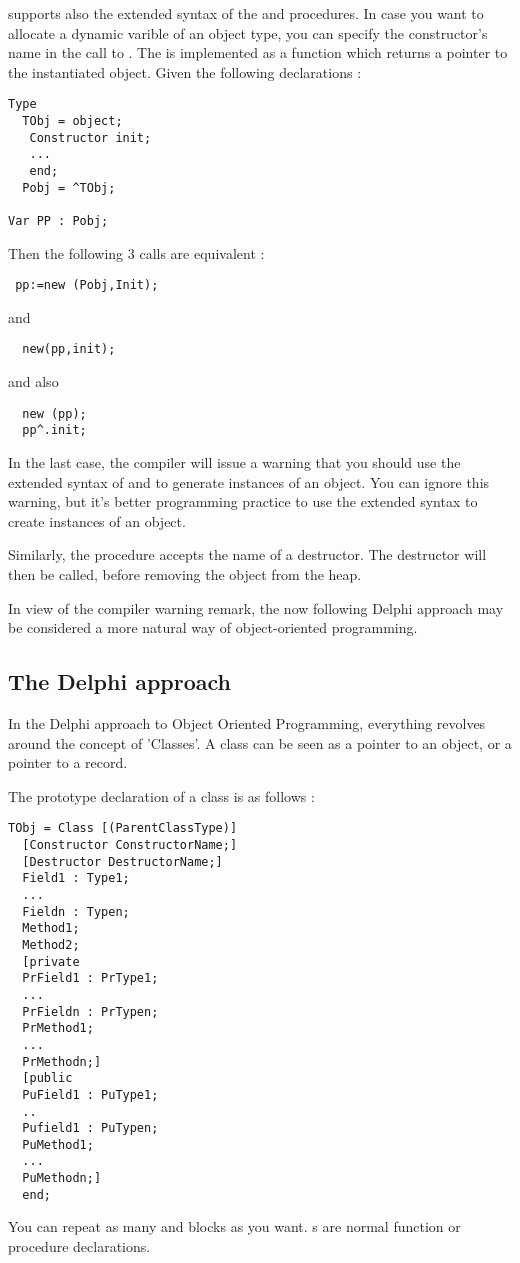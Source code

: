 \documentclass{report}
\begin{document}
\fpk supports also the extended syntax of the  and 
procedures. In case you want to allocate a dynamic varible of an object
type, you can specify the constructor's name in the call to .
The  is implemented as a function which returns a pointer to the
instantiated object. Given the following declarations :
\begin{verbatim}
Type
  TObj = object;
   Constructor init;
   ...
   end;
  Pobj = ^TObj;

Var PP : Pobj;
\end{verbatim}  
Then the following 3 calls are equivalent :
\begin{verbatim}
 pp:=new (Pobj,Init);
\end{verbatim}
and
\begin{verbatim}
  new(pp,init);
\end{verbatim}
and also
\begin{verbatim}
  new (pp);
  pp^.init;
\end{verbatim}
In the last case, the compiler will issue a warning that you should use the
extended syntax of  and  to generate instances of an
object. You can ignore this warning, but it's better programming practice to
use the extended syntax to create instances of an object.

Similarly, the  procedure accepts the name of a destructor. The
destructor will then be called, before removing the object from the heap.

In view of the compiler warning remark, the now following Delphi approach may 
be considered a more natural way of object-oriented programming.

\subsection{The Delphi approach}
In the Delphi approach to Object Oriented Programming, everything revolves
around  the concept of 'Classes'. 
A class can be seen as a pointer to an object, or a pointer to a record. 

The prototype declaration of a class is as follows :
\begin{verbatim}
TObj = Class [(ParentClassType)]
  [Constructor ConstructorName;]
  [Destructor DestructorName;]
  Field1 : Type1;
  ...
  Fieldn : Typen;
  Method1;
  Method2;
  [private
  PrField1 : PrType1;
  ...
  PrFieldn : PrTypen;
  PrMethod1;
  ...
  PrMethodn;]
  [public
  PuField1 : PuType1;
  ..
  Pufield1 : PuTypen;
  PuMethod1;
  ...
  PuMethodn;]
  end;
\end{verbatim}
You can repeat as many  and  blocks as you want.
s are normal function or procedure declarations. 
\end{document}
